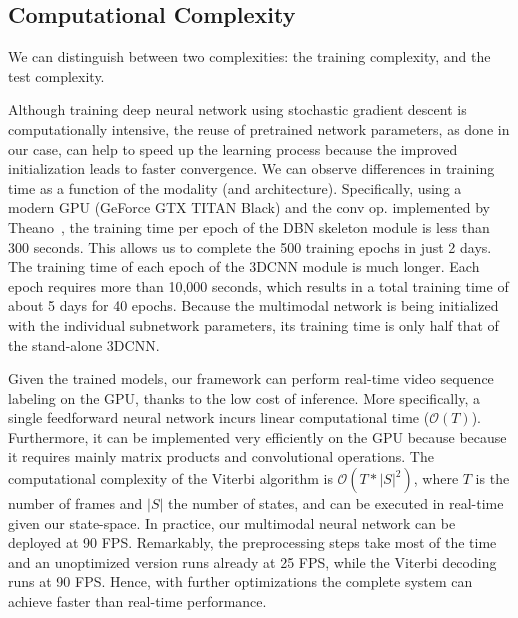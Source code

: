 \subsection{Computational Complexity}
\label{sec:ComputationalComplexity}

We can distinguish between two complexities: the training complexity, and the test complexity.

%
Although training deep neural network using stochastic gradient descent is computationally intensive,
the reuse of pretrained network parameters, as done in our case, can help to speed up the learning process because the improved initialization leads to faster convergence.
%
We can observe differences in training time as a function of the modality (and architecture).
%
Specifically, using a modern GPU (GeForce GTX TITAN Black) and the conv op. implemented by Theano~\cite{Bastien-Theano-2012},
the training time per epoch of the DBN skeleton module is less than 300 seconds. This allows us to complete the 500 training epochs in just 2 days.
%
The training time of each epoch of the 3DCNN \RGBD  module is much longer.
Each epoch requires more than 10,000 seconds, which results in a total training time of about 5 days for 40 epochs.
Because the multimodal network is being initialized with the individual subnetwork parameters, its training time is only half that of the stand-alone 3DCNN.


%
Given the trained models, our framework can perform real-time video sequence labeling on the GPU, thanks to the low cost of inference.
%
More specifically, a single feedforward neural network incurs linear computational time ($\mathcal{O}(T)$). Furthermore, it can be implemented very efficiently on the GPU because because it requires mainly matrix products and convolutional operations.
The computational complexity of the Viterbi algorithm is $\mathcal{O} (T* |S|^2)$, where
$T$ is the number of frames and $|S|$ the number of states, and can be executed in real-time given our state-space.
In practice, our multimodal neural network can be deployed at 90 FPS.
Remarkably, the preprocessing steps take most of the time and an unoptimized version runs already at 25 FPS, while the
 Viterbi decoding  runs at 90 FPS. Hence, with further optimizations the complete system can achieve faster than real-time performance.


\endinput
